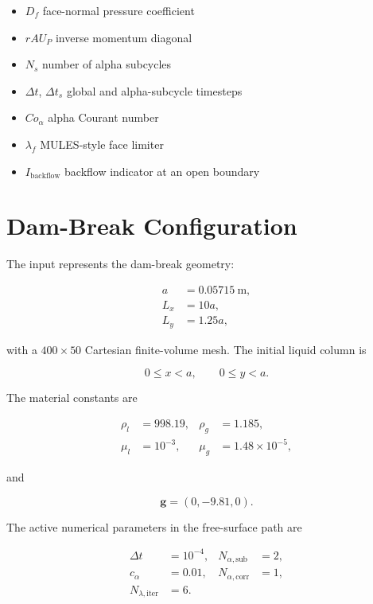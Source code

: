 \documentclass[11pt]{article}
\begin{document}
\begin{itemize}[leftmargin=2.5em]
  \item \(D_f\) face-normal pressure coefficient
  \item \(rAU_P\) inverse momentum diagonal
  \item \(N_s\) number of alpha subcycles
  \item \(\Delta t\), \(\Delta t_s\) global and alpha-subcycle timesteps
  \item \(Co_\alpha\) alpha Courant number
  \item \(\lambda_f\) MULES-style face limiter
  \item \(I_{\mathrm{backflow}}\) backflow indicator at an open boundary
\end{itemize}

\section{Dam-Break Configuration}

The input represents the dam-break geometry:

\begin{align}
  a &= 0.05715\ \mathrm{m}, \\
  L_x &= 10a, \\
  L_y &= 1.25a,
\end{align}

with a \(400\times 50\) Cartesian finite-volume mesh.  The initial liquid column
is

\begin{equation}
  0 \le x < a,
  \qquad
  0 \le y < a.
\end{equation}

The material constants are

\begin{align}
  \rho_l &= 998.19,
  &
  \rho_g &= 1.185, \\
  \mu_l &= 10^{-3},
  &
  \mu_g &= 1.48\times 10^{-5},
\end{align}

and

\begin{equation}
  \mathbf{g}=(0,-9.81,0).
\end{equation}

The active numerical parameters in the free-surface path are

\begin{align}
  \Delta t &= 10^{-4}, &
  N_{\alpha,\mathrm{sub}} &= 2, \\
  c_\alpha &= 0.01, &
  N_{\alpha,\mathrm{corr}} &= 1, \\
  N_{\lambda,\mathrm{iter}} &= 6.
\end{align}
\end{document}
